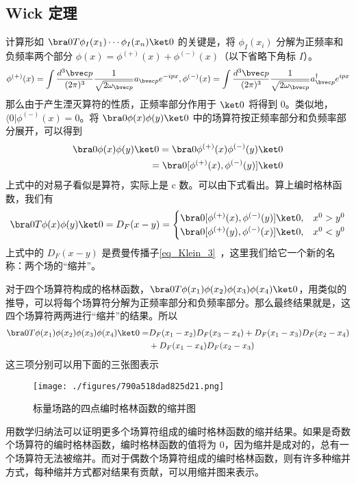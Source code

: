 \subsection{Wick 定理}
计算形如 $\bra 0 T\phi_I(x_1)\cdots\phi_I(x_n) \ket 0$ 的关键是，将 $\phi_I(x_i)$ 分解为正频率和负频率两个部分 $\phi( x)=\phi^{(+)}( x)+\phi^{(-)}( x)$（以下省略下角标 $I$）。
\begin{equation}
\phi^{(+)}( x) = \int \frac{d{}^3{\bvec p}}{(2\pi)^3} \frac{1}{\sqrt{2\omega_{\bvec p}}}a_{\bvec p} e^{-ipx} ,
\phi^{(-)}( x) = \int \frac{d{}^3{\bvec p}}{(2\pi)^3} \frac{1}{\sqrt{2\omega_{\bvec p}}}a_{\bvec p}^\dagger e^{ipx} 
\end{equation}
那么由于产生湮灭算符的性质，正频率部分作用于 $\ket 0$ 将得到 $0$。类似地，$\langle 0| \phi^{(-)}( x)=0$。将 $\bra 0 \phi(x)\phi(y)\ket 0$ 中的场算符按正频率部分和负频率部分展开，可以得到
\begin{equation}
\begin{aligned}
\bra 0 \phi( x)\phi( y)\ket 0=\bra 0 \phi^{(+)}( x)\phi^{(-)}( y)\ket 0\\
 = \bra 0[\phi^{(+)}( x),\phi^{(-)}( y)]\ket 0
\end{aligned}
\end{equation}
上式中的对易子看似是算符，实际上是 c 数。可以由下式看出。算上编时格林函数，我们有
\begin{equation}
\bra 0 T\phi( x)\phi( y)\ket 0=D_F(x-y)=\begin{cases}
\bra 0[\phi^{(+)}( x),\phi^{(-)}( y)]\ket 0, &x^0>y^0\\
\bra 0[\phi^{(+)}( y),\phi^{(-)}( x)]\ket 0, &x^0<y^0
\end{cases}
\end{equation}
上式中的 $D_F(x-y)$ 是费曼传播子\autoref{eq_Klein_3}~，这里我们给它一个新的名称：两个场的“缩并”。

对于四个场算符构成的格林函数，$\bra 0 T\phi(x_1)\phi(x_2)\phi(x_3)\phi(x_4)\ket 0$，用类似的推导，可以将每个场算符分解为正频率部分和负频率部分。那么最终结果就是，这四个场算符两两进行“缩并”的结果。所以
\begin{equation}
\begin{aligned}
\bra 0 T\phi(x_1)\phi(x_2)\phi(x_3)\phi(x_4)\ket 0=&D_F(x_1-x_2)D_F(x_3-x_4)+D_F(x_1-x_3)D_F(x_2-x_4)
\\&+D_F(x_1-x_4)D_F(x_2-x_3)
\end{aligned}
\end{equation}
这三项分别可以用下面的三张图表示
\begin{figure}[ht]
\centering
\texttt{[image: ./figures/790a518dad825d21.png]}
\caption{标量场路的四点编时格林函数的缩并图} \label{fig_wick_1}
\end{figure}

用数学归纳法可以证明更多个场算符组成的编时格林函数的缩并结果。如果是奇数个场算符的编时格林函数，编时格林函数的值将为 $0$，因为缩并是成对的，总有一个场算符无法被缩并。而对于偶数个场算符组成的编时格林函数，则有许多种缩并方式，每种缩并方式都对结果有贡献，可以用缩并图来表示。